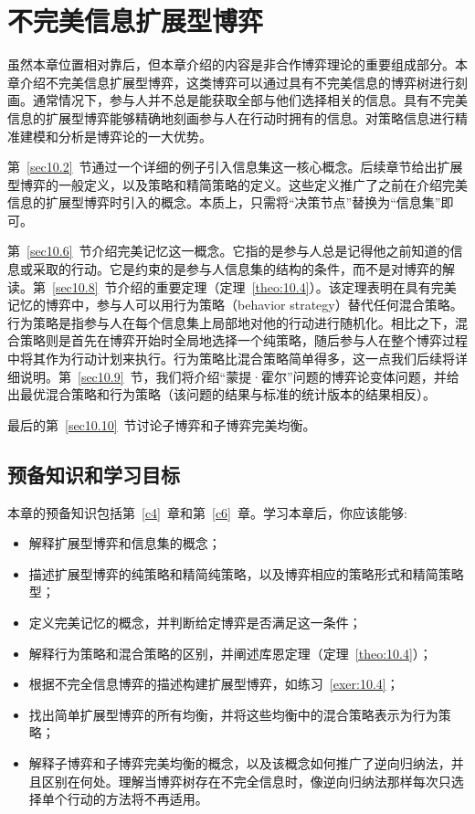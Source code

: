 \chapter{不完美信息扩展型博弈}\label{c10}

虽然本章位置相对靠后，但本章介绍的内容是非合作博弈理论的重要组成部分。本章介绍不完美信息扩展型博弈，这类博弈可以通过具有不完美信息的博弈树进行刻画。通常情况下，参与人并不总是能获取全部与他们选择相关的信息。具有不完美信息的扩展型博弈能够精确地刻画参与人在行动时拥有的信息。对策略信息进行精准建模和分析是博弈论的一大优势。

第~\ref{sec10.2}~节通过一个详细的例子引入信息集这一核心概念。后续章节给出扩展型博弈的一般定义，以及策略和精简策略的定义。这些定义推广了之前在介绍完美信息的扩展型博弈时引入的概念。本质上，只需将“决策节点”替换为“信息集”即可。

第~\ref{sec10.6}~节介绍完美记忆这一概念。它指的是参与人总是记得他之前知道的信息或采取的行动。它是约束的是参与人信息集的结构的条件，而不是对博弈的解读。第~\ref{sec10.8}~节介绍\citet{kuhn1953}的重要定理（定理~\ref{theo:10.4}）。该定理表明在具有完美记忆的博弈中，参与人可以用行为策略（behavior strategy）替代任何混合策略。行为策略是指参与人在每个信息集上局部地对他的行动进行随机化。相比之下，混合策略则是首先在博弈开始时全局地选择一个纯策略，随后参与人在整个博弈过程中将其作为行动计划来执行。行为策略比混合策略简单得多，这一点我们后续将详细说明。第~\ref{sec10.9}~节，我们将介绍“蒙提·霍尔”问题的博弈论变体问题，并给出最优混合策略和行为策略（该问题的结果与标准的统计版本的结果相反）。

最后的第~\ref{sec10.10}~节讨论子博弈和子博弈完美均衡。

\section{预备知识和学习目标}\label{sec10.1}

本章的预备知识包括第~\ref{c4}~章和第~\ref{c6}~章。学习本章后，你应该能够:

\begin{itemize}
\item 解释扩展型博弈和信息集的概念；
\item 描述扩展型博弈的纯策略和精简纯策略，以及博弈相应的策略形式和精简策略型；
\item 定义完美记忆的概念，并判断给定博弈是否满足这一条件；
\item 解释行为策略和混合策略的区别，并阐述库恩定理（定理~\ref{theo:10.4}）；
\item 根据不完全信息博弈的描述构建扩展型博弈，如练习~\ref{exer:10.4}；
\item 找出简单扩展型博弈的所有均衡，并将这些均衡中的混合策略表示为行为策略；
\item 解释子博弈和子博弈完美均衡的概念，以及该概念如何推广了逆向归纳法，并且区别在何处。理解当博弈树存在不完全信息时，像逆向归纳法那样每次只选择单个行动的方法将不再适用。
\end{itemize}


